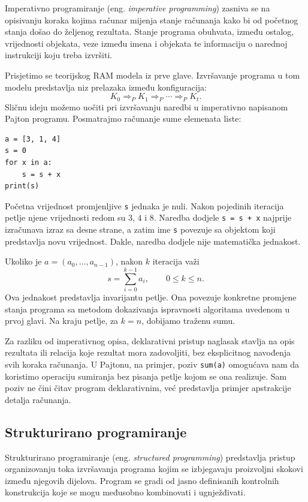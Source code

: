 Imperativno programiranje (eng. \textit{imperative programming}) zasniva se na opisivanju koraka kojima računar mijenja stanje računanja kako bi od početnog stanja došao do željenog rezultata. Stanje programa obuhvata, između ostalog, vrijednosti objekata, veze između imena i objekata te informaciju o narednoj instrukciji koju treba izvršiti.

Prisjetimo se teorijskog RAM modela iz prve glave. Izvršavanje programa u tom modelu predstavlja niz prelazaka između konfiguracija:
\[
K_0\Rightarrow_P K_1\Rightarrow_P\cdots\Rightarrow_P K_t.
\]
Sličnu ideju možemo uočiti pri izvršavanju naredbi u imperativno napisanom Pajton programu. Posmatrajmo računanje sume elemenata liste:

\begin{verbatim}
a = [3, 1, 4]
s = 0
for x in a:
    s = s + x
print(s)
\end{verbatim}

Početna vrijednost promjenljive \texttt{s} jednaka je nuli. Nakon pojedinih iteracija petlje njene vrijednosti redom su $3$, $4$ i $8$. Naredba dodjele \texttt{s = s + x} najprije izračunava izraz sa desne strane, a zatim ime \texttt{s} povezuje sa objektom koji predstavlja novu vrijednost. Dakle, naredba dodjele nije matematička jednakost.

Ukoliko je $a=(a_0,\ldots,a_{n-1})$, nakon $k$ iteracija važi
\[
s=\sum_{i=0}^{k-1}a_i,\qquad 0\leq k\leq n.
\]
Ova jednakost predstavlja invarijantu petlje. Ona povezuje konkretne promjene stanja programa sa metodom dokazivanja ispravnosti algoritama uvedenom u prvoj glavi. Na kraju petlje, za $k=n$, dobijamo traženu sumu.

Za razliku od imperativnog opisa, deklarativni pristup naglasak stavlja na opis rezultata ili relacija koje rezultat mora zadovoljiti, bez eksplicitnog navođenja svih koraka računanja. U Pajtonu, na primjer, poziv \texttt{sum(a)} omogućava nam da koristimo operaciju sumiranja bez pisanja petlje kojom se ona realizuje. Sam poziv ne čini čitav program deklarativnim, već predstavlja primjer apstrakcije detalja računanja.

\subsection{Strukturirano programiranje}

Strukturirano programiranje (eng. \textit{structured programming}) predstavlja pristup organizovanju toka izvršavanja programa kojim se izbjegavaju proizvoljni skokovi između njegovih dijelova. Program se gradi od jasno definisanih kontrolnih konstrukcija koje se mogu međusobno kombinovati i ugnježđivati.

